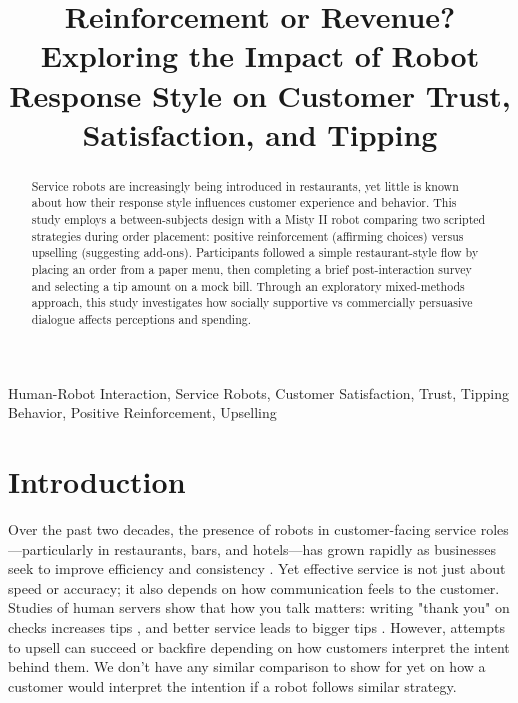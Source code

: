 \documentclass[conference]{IEEEtran}
\begin{document}
\title{Reinforcement or Revenue? Exploring the Impact of Robot Response Style on Customer Trust, Satisfaction, and Tipping}

\author{
\and
{}
}

\maketitle

\begin{abstract}
Service robots are increasingly being introduced in restaurants, yet little is known about how their response style influences customer experience and behavior. This study employs a between-subjects design with a Misty II robot comparing two scripted strategies during order placement: positive reinforcement (affirming choices) versus upselling (suggesting add-ons). Participants followed a simple restaurant-style flow by placing an order from a paper menu, then completing a brief post-interaction survey and selecting a tip amount on a mock bill. Through an exploratory mixed-methods approach, this study investigates how socially supportive vs commercially persuasive dialogue affects perceptions and spending.
\end{abstract}

\begin{IEEEkeywords}
Human-Robot Interaction, Service Robots, Customer Satisfaction, Trust, Tipping Behavior, Positive Reinforcement, Upselling
\end{IEEEkeywords}

\section{Introduction}
\label{sec:introduction}

Over the past two decades, the presence of robots in customer-facing service roles—particularly in restaurants, bars, and hotels—has grown rapidly as businesses seek to improve efficiency and consistency \cite{b1, b2}. Yet effective service is not just about speed or accuracy; it also depends on how communication feels to the customer. Studies of human servers show that how you talk matters: writing "thank you" on checks increases tips \cite{b3}, and better service leads to bigger tips \cite{b4}. However, attempts to upsell can succeed or backfire depending on how customers interpret the intent behind them. We don't have any similar comparison to show for yet on how a customer would interpret the intention if a robot follows similar strategy.
\end{document}
